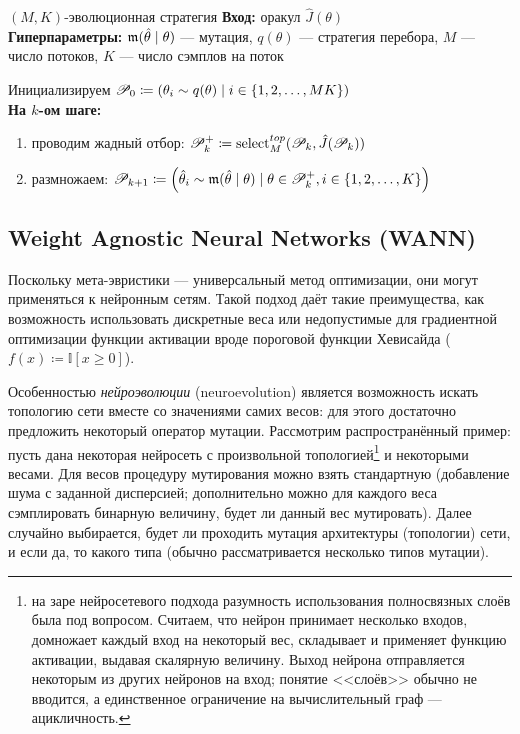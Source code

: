 \begin{algorithm}{$(M, K)$-эволюционная стратегия}
\textbf{Вход:} оракул $\hat{J}(\theta)$ \\
\textbf{Гиперпараметры:} $\mathfrak{m}(\hat{\theta} \mid \theta)$ --- мутация, $q(\theta)$ --- стратегия перебора, $M$ --- число потоков, $K$ --- число сэмплов на поток

\vspace{0.3cm}
Инициализируем $\mathscr{P}_0 \coloneqq \left( \theta_i \sim q(\theta) \mid i \in \{1, 2, \dots , MK \} \right)$ \\
\textbf{На $k$-ом шаге:}
\begin{enumerate}
    \item проводим жадный отбор: $\mathscr{P}^{+}_k \coloneqq \mathrm{select}^{\mathop{top}}_M(\mathscr{P}_k, \hat{J}(\mathscr{P}_k))$
    \item размножаем: $\mathscr{P}_{k+1} \coloneqq \left( \hat{\theta}_i \sim \mathfrak{m}(\hat{\theta} \mid \theta) \mid \theta \in \mathscr{P}^{+}_k, i \in \{1, 2, \dots , K\} \right)$
\end{enumerate}
\end{algorithm}

\begin{example}
\begin{center}
\end{center}
\end{example}

\subsection{Weight Agnostic Neural Networks (WANN)}

Поскольку мета-эвристики --- универсальный метод оптимизации, они могут применяться к нейронным сетям. Такой подход даёт такие преимущества, как возможность использовать дискретные веса или недопустимые для градиентной оптимизации функции активации вроде пороговой функции Хевисайда ($f(x) \coloneqq \mathbb{I}[x \ge 0]$). 

Особенностью \emph{нейроэволюции} (neuroevolution) является возможность искать топологию сети вместе со значениями самих весов: для этого достаточно предложить некоторый оператор мутации. Рассмотрим распространённый пример: пусть дана некоторая нейросеть с произвольной топологией\footnote{на заре нейросетевого подхода разумность использования полносвязных слоёв была под вопросом. Считаем, что нейрон принимает несколько входов, домножает каждый вход на некоторый вес, складывает и применяет функцию активации, выдавая скалярную величину. Выход нейрона отправляется некоторым из других нейронов на вход; понятие <<слоёв>> обычно не вводится, а единственное ограничение на вычислительный граф --- ацикличность.} и некоторыми весами. Для весов процедуру мутирования можно взять стандартную (добавление шума с заданной дисперсией; дополнительно можно для каждого веса сэмплировать бинарную величину, будет ли данный вес мутировать). Далее случайно выбирается, будет ли проходить мутация архитектуры (топологии) сети, и если да, то какого типа (обычно рассматривается несколько типов мутации).

